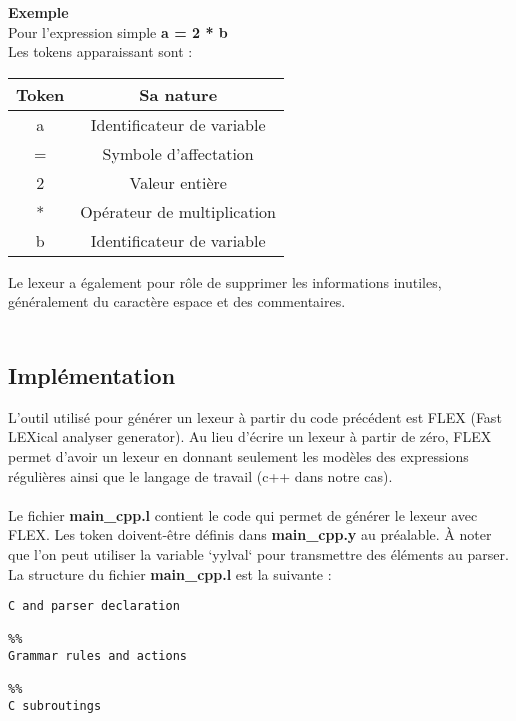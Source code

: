 \documentclass[a4paper]{article}
\begin{document}
    \textbf{Exemple} \\
    Pour l'expression simple \textbf{a = 2 * b} \\
    Les tokens apparaissant sont : \\
    \begin{center}
    \begin{tabular}{ | c | c | }
    \hline
    \textbf{Token} & \textbf{Sa nature} \\ 
    \hline
    a & Identificateur de variable \\ 
    \hline
    = & Symbole d'affectation \\  
    \hline
    2 & Valeur entière \\
    \hline
    * & Opérateur de multiplication \\
    \hline
    b & Identificateur de variable \\
    \hline
\end{tabular}
\end{center}

Le lexeur a également pour rôle de supprimer les informations inutiles, généralement du caractère espace et des commentaires.\\~\\

\subsection{Implémentation}
L'outil utilisé pour générer un lexeur à partir du code précédent est FLEX (Fast LEXical analyser generator). Au lieu d'écrire un lexeur à partir de zéro, FLEX permet d'avoir un lexeur en donnant seulement les modèles des expressions régulières ainsi que le langage de travail (c++ dans notre cas).\\~\\
\noindent
Le fichier \textbf{main\_cpp.l} contient le code qui permet de générer le lexeur avec FLEX. Les token doivent-être définis dans \textbf{main\_cpp.y} au préalable.
À noter que l'on peut utiliser la variable `yylval` pour transmettre des
éléments au parser.\\

La structure du fichier \textbf{main\_cpp.l} est la suivante :

\begin{lstlisting}
C and parser declaration

%%
Grammar rules and actions

%%
C subroutings
\end{lstlisting}\leavevmode\newline
\end{document}
